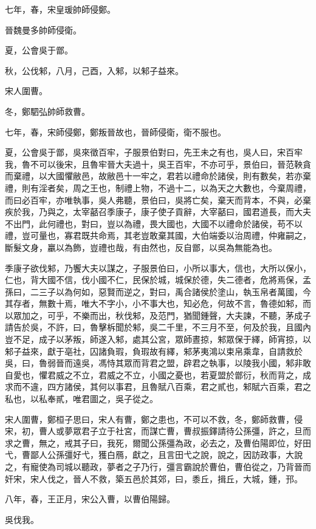 \begin{pinyinscope}
七年，春，宋皇瑗帥師侵鄭。

晉魏曼多帥師侵衛。

夏，公會吳于鄫。

秋，公伐邾，八月，己酉，入邾，以邾子益來。

宋人圍曹。

冬，鄭駟弘帥師救曹。

七年，春，宋師侵鄭，鄭叛晉故也，晉師侵衛，衛不服也。

夏，公會吳于鄫，吳來徵百牢，子服景伯對曰，先王未之有也，吳人曰，宋百牢我，魯不可以後宋，且魯牢晉大夫過十，吳王百牢，不亦可乎，景伯曰，晉范鞅貪而棄禮，以大國懼敝邑，故敝邑十一牢之，君若以禮命於諸侯，則有數矣，若亦棄禮，則有淫者矣，周之王也，制禮上物，不過十二，以為天之大數也，今棄周禮，而曰必百牢，亦唯執事，吳人弗聽，景伯曰，吳將亡矣，棄天而背本，不與，必棄疾於我，乃與之，太宰嚭召季康子，康子使子貢辭，大宰嚭曰，國君道長，而大夫不出門，此何禮也，對曰，豈以為禮，畏大國也，大國不以禮命於諸侯，苟不以禮，豈可量也，寡君既共命焉，其老豈敢棄其國，大伯端委以治周禮，仲雍嗣之，斷髮文身，臝以為飾，豈禮也哉，有由然也，反自鄫，以吳為無能為也。

季康子欲伐邾，乃饗大夫以謀之，子服景伯曰，小所以事大，信也，大所以保小，仁也，背大國不信，伐小國不仁，民保於城，城保於德，失二德者，危將焉保，孟孫曰，二三子以為何如，惡賢而逆之，對曰，禹合諸侯於塗山，執玉帛者萬國，今其存者，無數十焉，唯大不字小，小不事大也，知必危，何故不言，魯德如邾，而以眾加之，可乎，不樂而出，秋伐邾，及范門，猶聞鍾聲，大夫諫，不聽，茅成子請告於吳，不許，曰，魯擊柝聞於邾，吳二千里，不三月不至，何及於我，且國內豈不足，成子以茅叛，師遂入邾，處其公宮，眾師晝掠，邾眾保于繹，師宵掠，以邾子益來，獻于亳社，囚諸負瑕，負瑕故有繹，邾茅夷鴻以束帛乘韋，自請救於吳，曰，魯弱晉而遠吳，馮恃其眾而背君之盟，辟君之執事，以陵我小國，邾非敢自愛也，懼君威之不立，君威之不立，小國之憂也，若夏盟於鄫衍，秋而背之，成求而不違，四方諸侯，其何以事君，且魯賦八百乘，君之貳也，邾賦六百乘，君之私也，以私奉貳，唯君圖之，吳子從之。

宋人圍曹，鄭桓子思曰，宋人有曹，鄭之患也，不可以不救，冬，鄭師救曹，侵宋，初，曹人或夢眾君子立于社宮，而謀亡曹，曹叔振鐸請待公孫彊，許之，旦而求之曹，無之，戒其子曰，我死，爾聞公孫彊為政，必去之，及曹伯陽即位，好田弋，曹鄙人公孫彊好弋，獲白鴈，獻之，且言田弋之說，說之，因訪政事，大說之，有寵使為司城以聽政，夢者之子乃行，彊言霸說於曹伯，曹伯從之，乃背晉而奸宋，宋人伐之，晉人不救，築五邑於其郊，曰，黍丘，揖丘，大城，鍾，邘。

八年，春，王正月，宋公入曹，以曹伯陽歸。

吳伐我。


\end{pinyinscope}
